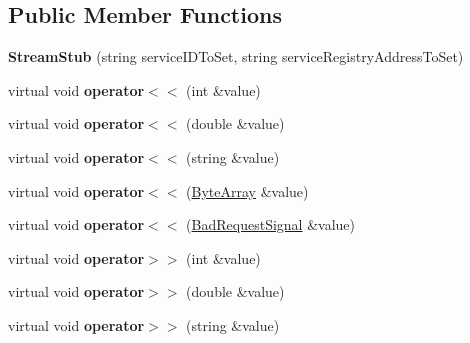\subsection*{Public Member Functions}
\begin{DoxyCompactItemize}
\item 
\hypertarget{class_stream_stub_ae908d02c5571778fc781f3ed3fdcb3d6}{
{\bfseries StreamStub} (string serviceIDToSet, string serviceRegistryAddressToSet)}
\label{class_stream_stub_ae908d02c5571778fc781f3ed3fdcb3d6}

\item 
\hypertarget{class_stream_stub_acf604ee788b96883244a31cc3be9239c}{
virtual void {\bfseries operator$<$$<$} (int \&value)}
\label{class_stream_stub_acf604ee788b96883244a31cc3be9239c}

\item 
\hypertarget{class_stream_stub_ade1db1524dd3bba1ba1c9248a2c02f79}{
virtual void {\bfseries operator$<$$<$} (double \&value)}
\label{class_stream_stub_ade1db1524dd3bba1ba1c9248a2c02f79}

\item 
\hypertarget{class_stream_stub_a126a9e7eb0f66ee1f81267ce720eca67}{
virtual void {\bfseries operator$<$$<$} (string \&value)}
\label{class_stream_stub_a126a9e7eb0f66ee1f81267ce720eca67}

\item 
\hypertarget{class_stream_stub_afec66fca7c34dd2dca929f3172253b99}{
virtual void {\bfseries operator$<$$<$} (\hyperlink{class_byte_array}{ByteArray} \&value)}
\label{class_stream_stub_afec66fca7c34dd2dca929f3172253b99}

\item 
\hypertarget{class_stream_stub_a5d3d7fd58f0d65b4fc885c28a7a7f730}{
virtual void {\bfseries operator$<$$<$} (\hyperlink{class_bad_request_signal}{BadRequestSignal} \&value)}
\label{class_stream_stub_a5d3d7fd58f0d65b4fc885c28a7a7f730}

\item 
\hypertarget{class_stream_stub_ac5391c6c1ae0ea166e780384a5eb6238}{
virtual void {\bfseries operator$>$$>$} (int \&value)}
\label{class_stream_stub_ac5391c6c1ae0ea166e780384a5eb6238}

\item 
\hypertarget{class_stream_stub_a3b1b353c90c7424d6dd9db17c6308451}{
virtual void {\bfseries operator$>$$>$} (double \&value)}
\label{class_stream_stub_a3b1b353c90c7424d6dd9db17c6308451}

\item 
\hypertarget{class_stream_stub_aa8d4ca628bcae1570c54c9a44f5a6519}{
virtual void {\bfseries operator$>$$>$} (string \&value)}
\label{class_stream_stub_aa8d4ca628bcae1570c54c9a44f5a6519}


\end{DoxyCompactItemize}
